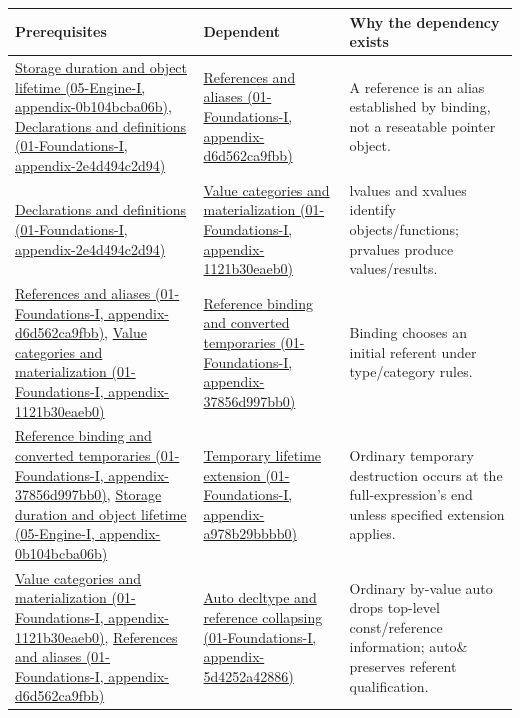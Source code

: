 {\def\LTcaptype{none} %
\begin{longtable}[]{@{}
  >{\raggedright\arraybackslash}p{}
  >{\raggedright\arraybackslash}p{}
  >{\raggedright\arraybackslash}p{}@{}}
\toprule\noalign{}
\begin{minipage}[b]{\linewidth}\raggedright
Prerequisites
\end{minipage} & \begin{minipage}[b]{\linewidth}\raggedright
Dependent
\end{minipage} & \begin{minipage}[b]{\linewidth}\raggedright
Why the dependency exists
\end{minipage} \\
\midrule\noalign{}
\endhead
\bottomrule\noalign{}
\endlastfoot
\href{}{Storage duration and object lifetime (05-Engine-I, appendix-0b104bcba06b)}, \href{}{Declarations and definitions (01-Foundations-I, appendix-2e4d494c2d94)} & \href{}{References and aliases (01-Foundations-I, appendix-d6d562ca9fbb)} & A reference is an alias established by binding, not a reseatable pointer object. \\
\href{}{Declarations and definitions (01-Foundations-I, appendix-2e4d494c2d94)} & \href{}{Value categories and materialization (01-Foundations-I, appendix-1121b30eaeb0)} & lvalues and xvalues identify objects/functions; prvalues produce values/results. \\
\href{}{References and aliases (01-Foundations-I, appendix-d6d562ca9fbb)}, \href{}{Value categories and materialization (01-Foundations-I, appendix-1121b30eaeb0)} & \href{}{Reference binding and converted temporaries (01-Foundations-I, appendix-37856d997bb0)} & Binding chooses an initial referent under type/category rules. \\
\href{}{Reference binding and converted temporaries (01-Foundations-I, appendix-37856d997bb0)}, \href{}{Storage duration and object lifetime (05-Engine-I, appendix-0b104bcba06b)} & \href{}{Temporary lifetime extension (01-Foundations-I, appendix-a978b29bbbb0)} & Ordinary temporary destruction occurs at the full-expression's end unless specified extension applies. \\
\href{}{Value categories and materialization (01-Foundations-I, appendix-1121b30eaeb0)}, \href{}{References and aliases (01-Foundations-I, appendix-d6d562ca9fbb)} & \href{}{Auto decltype and reference collapsing (01-Foundations-I, appendix-5d4252a42886)} & Ordinary by-value auto drops top-level const/reference information; auto\& preserves referent qualification. \\

\end{longtable}}
